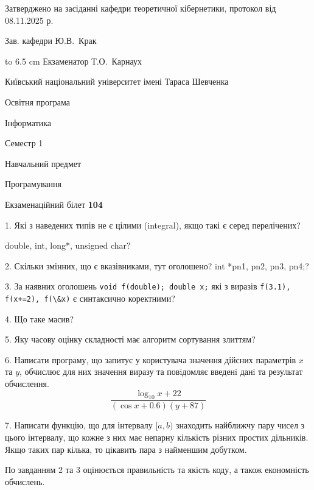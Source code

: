 \documentclass[12pt, ukrainian]{article}
\def\code#1{\Verb!#1!}
\begin{document}
{\smallskip\smallskip \begin {scriptsize} Затверджено на засіданні кафедри теоретичної кібернетики, протокол   від   08.11.2025 р.\par\smallskip\smallskip\smallskip\smallskip
{\parbox {6.5 cm} {Зав. кафедри \dotfill Ю.В.~Крак}}\hspace {0.7cm} {\hbox to 6.5 cm { Екзаменатор \dotfill Т.О.~Карнаух}} \end{scriptsize}}
\vspace{0.9cm}
{{\begin {scriptsize}\par
{ \center  Київський національний університет імені Тараса Шевченка \par}
{\parbox {5 cm}{Освітня програма \hfill}{\parbox {7 cm}{Інформатика\hfill}}\parbox {6 cm}{\hfill Семестр 1}}\par
{\parbox {5 cm} {Навчальний предмет \hfill}\parbox {7 cm}{Програмування \hfill}\parbox {6cm}{\hfill}\par}\vspace{-15pt} \end{scriptsize}}{\center Екзаменаційний білет \No \textbf { 104 }\par}}
{%
1. Які з наведених типів не є цілими (integral), якщо такі є серед перелічених?

double, int, long*, unsigned char?
\par
\vspace{2mm}
2. Скільки змінних, що є вказівниками, тут оголошено?
int *pn1, pn2, pn3, pn4;?
\par
\vspace{2mm}
3. За наявних оголошень \code{void f(double); double x;} які з виразів \code{f(3.1), f(x+=2), f(\&x)} є синтаксично коректними?
\par
\vspace{2mm}
4. Що таке масив?
\par
\vspace{2mm}
5. Яку часову оцінку складності має алгоритм сортування злиттям?
\par
\vspace{2mm}
6. Написати програму, що запитує у користувача значення дійсних параметрів $x$ та $y$, обчислює для них значення виразу та повiдомляє введенi данi та результат обчислення.
$$\frac{\log_{10} x + 22}{(\cos x + 0.6) (y + 87)}$$ 

\par
7. Написати функцію, що для інтервалу $[a, b)$ знаходить найближчу пару чисел з цього інтервалу, що кожне з них має непарну кількість різних простих дільників. Якщо таких пар кілька, то цікавить пара з найменшим добутком.

По завданням 2 та 3 оцінюється правильність та якість коду, а також економність обчислень.

}
\end{document}
